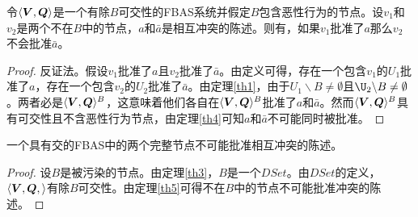 \begin{theorem}\label{th5}
	令$\langle{\bm V},{\bm Q}\rangle$是一个有除$B${\quorum}可交性的FBAS系统并假定$B$包含恶性行为的节点。设$v_1$和$v_2$是两个不在$B$中的节点，$a$和$\bar a$是相互冲突的陈述。则有，如果$v_1$批准了$a$那么$v_2$不会批准$\bar a$。
\end{theorem}

\begin{proof}
	反证法。假设$v_1$批准了$a$且$v_2$批准了$\bar a$。由定义可得，存在一个包含$v_1$的{\quorum}$U_1$批准了$a$，存在一个包含$v_2$的{\quorum}$U_2$批准了$\bar a$。由定理\ref{th1}，由于$U_1\backslash B\neq \emptyset$且$\U_2\backslash B\neq \emptyset$。两者必是$\langle{\bm V},{\bm Q}\rangle^{B}$，这意味着他们各自在$\langle{\bm V},{\bm Q}\rangle^{B}$批准了$a$和$\bar a$。然而$\langle{\bm V},{\bm Q}\rangle^{B}$具有{\quorum}可交性且不含恶性行为节点，由定理\ref{th4}可知$a$和$\bar a$不可能同时被批准。
\end{proof}

\begin{theorem}[th6]
	一个具有{\quorum}交的FBAS中的两个完整节点不可能批准相互冲突的陈述。
\end{theorem}

\begin{proof}
	设$B$是被污染的节点。由定理\ref{th3}，$B$是一个$DSet$。由$DSet$的定义，$\langle{\bm V},{\bm Q},\rangle$有除$B${\quorum}可交性。由定理\ref{th5}可得不在$B$中的节点不可能批准冲突的陈述。
\end{proof}